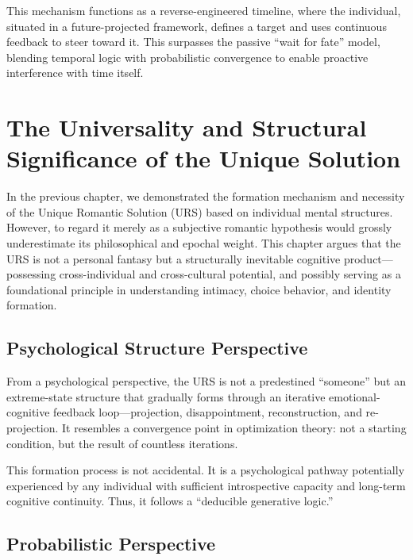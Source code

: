 \documentclass{article}
\begin{document}
This mechanism functions as a reverse-engineered timeline, where the individual, situated in a future-projected framework, defines a target and uses continuous feedback to steer toward it. This surpasses the passive “wait for fate” model, blending temporal logic with probabilistic convergence to enable proactive interference with time itself.

\section{The Universality and Structural Significance of the Unique Solution}

In the previous chapter, we demonstrated the formation mechanism and necessity of the Unique Romantic Solution (URS) based on individual mental structures. However, to regard it merely as a subjective romantic hypothesis would grossly underestimate its philosophical and epochal weight. This chapter argues that the URS is not a personal fantasy but a structurally inevitable cognitive product—possessing cross-individual and cross-cultural potential, and possibly serving as a foundational principle in understanding intimacy, choice behavior, and identity formation.

\subsection{Psychological Structure Perspective}

From a psychological perspective, the URS is not a predestined “someone” but an extreme-state structure that gradually forms through an iterative emotional-cognitive feedback loop—projection, disappointment, reconstruction, and re-projection. It resembles a convergence point in optimization theory: not a starting condition, but the result of countless iterations.

This formation process is not accidental. It is a psychological pathway potentially experienced by any individual with sufficient introspective capacity and long-term cognitive continuity. Thus, it follows a “deducible generative logic.”

\subsection{Probabilistic Perspective}
\end{document}
